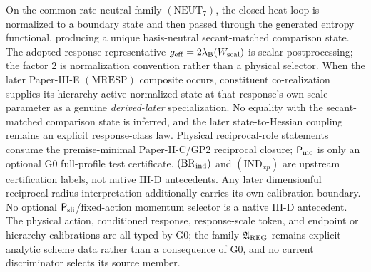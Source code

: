 \documentclass[12pt,a4paper]{article}
\begin{document}
On the common-rate neutral family \((\mathrm{NEUT}_7)\), the
closed heat loop is normalized to a boundary state and then passed through
the generated entropy functional, producing a unique basis-neutral
secant-matched comparison state.  The adopted response representative
\(g_{\rm eff}=2\lambda_{\rm B}(W_{\rm scal})\)
is scalar postprocessing; the factor \(2\) is normalization convention rather
than a physical selector.  When the later Paper-III-E \((\mathrm{MRESP})\)
composite occurs, constituent co-realization supplies its hierarchy-active
normalized state at that response's own scale parameter as a genuine
\emph{derived-later} specialization.  No equality with the secant-matched
comparison state is inferred, and the later state-to-Hessian coupling remains
an explicit response-class law.  Physical reciprocal-role statements consume the
premise-minimal Paper-II-C/GP2 reciprocal closure; \(\mathsf P_{\rm mc}\) is
only an optional G0 full-profile test certificate.
\((\mathrm{BR}_{\rm ind})\) and \((\mathrm{IND}_{xp})\) are upstream
certification labels, not native III-D antecedents.  Any later dimensionful
reciprocal-radius interpretation additionally carries its own calibration
boundary.  No optional \(\mathsf P_{\rm sli}\)/fixed-action momentum selector
is a native III-D antecedent.
The physical action, conditioned response, response-scale token, and
endpoint or hierarchy calibrations are all typed by G0; the family
\(\mathfrak A_{\rm REG}\) remains explicit analytic scheme data rather than a
consequence of G0, and no current discriminator selects its source member.
\printbibliography
\end{document}
